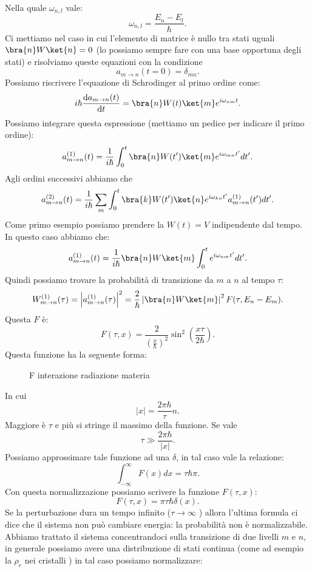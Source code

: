 Nella quale $\omega_{n,l}$  vale:
\[
\omega_{n,l}=\frac{E_n-E_l}{\hbar }
.\] 
Ci mettiamo nel caso in cui l'elemento di matrice è nullo tra stati uguali $\bra{n}W\ket{n} = 0$ (lo possiamo sempre fare con una base opportuna degli stati) e risolviamo queste equazioni con la condizione 
\[
    a_{m\to n}(t=0) = \delta_{mn}
.\] 
Possiamo riscrivere l'equazione di Schrodinger al primo ordine come:
\[
    i\hbar \frac{\text{d} a_{m\to n}(t) }{\text{d} t} 
    =
    \bra{n}W(t) \ket{m}e^{i\omega_{nm}t }
.\] 
Possiamo integrare questa espressione (mettiamo un pedice per indicare il primo ordine):
\[
    a_{m\to n}^{(1) } (t) =
    \frac{1}{i\hbar }
    \int_{0}^{t} \bra{n}W(t')\ket{m}e^{i\omega_{mn}t'} dt'
.\] 
Agli ordini successivi abbiamo che
\[
    a_{m\to n}^{(2)}(t)=
    \frac{1}{i\hbar }
    \sum_{m}^{} \int_{0}^{t}  
    \bra{k}W(t')\ket{n}e^{i\omega_{kn}t'}a_{m\to n}^{(1)}(t')  dt'
.\] 
Come primo esempio possiamo prendere la $W(t) = V$  indipendente dal tempo. In questo caso abbiamo che:
\[
    a_{m\to n}^{(1)}(t) =
    \frac{1}{i\hbar }\bra{n}W \ket{m} \int_{0}^{t} e^{i\omega_{nm}t'}dt'
.\] 
Quindi possiamo trovare la probabilità di transizione da $m$ a $n$ al tempo $\tau$:
\[
    W^{(1)}_{m\to n}(\tau)=
    \left|a_{m\to n}^{(1)}(\tau) \right|^2 = \frac{2}{\hbar }\left|\bra{n}W \ket{m}\right|^2F(\tau,E_n-E_m) 
.\] 
Questa $F$ è:
\[
    F(\tau,x) = \frac{2}{\left(\frac{x}{\hbar }\right)^2}\sin^2\left(\frac{x\tau}{2\hbar }\right) 
.\] 
Questa funzione ha la seguente forma:
\begin{figure}[H]
    \centering
    \caption{F interazione radiazione materia}
    \label{fig:f-interazione-radiazione-materia}
\end{figure}
In cui 
\[
\left|x\right|=\frac{2\pi\hbar }{\tau}n
.\] 
Maggiore è $\tau$ e più si stringe il massimo della funzione. Se vale
\[
\tau \gg \frac{2\pi\hbar }{\left|x\right|} 
.\] 
Possiamo approssimare tale funzione ad una $\delta$, in tal caso vale la relazione:
\[
    \int_{-\infty}^{\infty} F(x) dx = \tau \hbar \pi 
.\] 
Con questa normalizzazione possiamo scrivere la funzione $F(\tau,x)$: 
\[
    F(\tau,x) =\pi\tau\hbar \delta (x)  
.\] 
Se la perturbazione dura un tempo infinito ($\tau\to \infty$ ) allora l'ultima formula ci dice che il sistema non può cambiare energia: la probabilità non è normalizzabile. \\
Abbiamo trattato il sistema concentrandoci sulla transizione di due livelli $m$ e $n$, in generale possiamo avere una distribuzione di stati continua (come ad esempio la $\rho_e$ nei cristalli ) in tal caso possiamo normalizzare:
